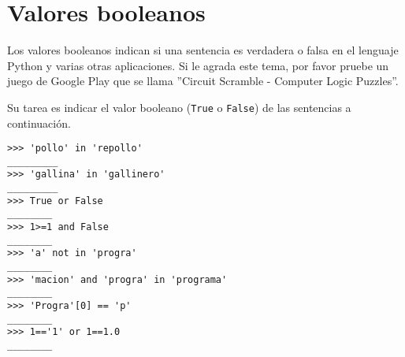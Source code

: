 \section*{Valores booleanos}

Los valores booleanos indican si una sentencia es verdadera o falsa en el lenguaje Python y varias otras aplicaciones. Si le agrada este tema, por favor pruebe un juego de Google Play que se llama ''Circuit Scramble - Computer Logic Puzzles''. 

Su tarea es indicar el valor booleano (\texttt{True} o \texttt{False}) de las sentencias a continuación.

\begin{lstlisting}[style=consola]
>>> 'pollo' in 'repollo'
_________
>>> 'gallina' in 'gallinero'
_________
>>> True or False
________
>>> 1>=1 and False
________
>>> 'a' not in 'progra'
________
>>> 'macion' and 'progra' in 'programa'
________
>>> 'Progra'[0] == 'p'
________
>>> 1=='1' or 1==1.0
________
\end{lstlisting}

